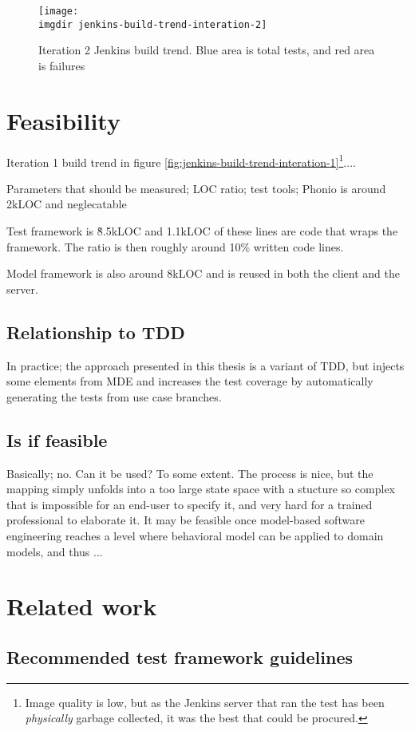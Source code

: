 \begin{figure}[!hbpt]
\centering
\texttt{[image: \\imgdir jenkins-build-trend-interation-2]}
\caption{Iteration 2 Jenkins build trend. Blue area is total tests, and red area is failures}
\label{fig:jenkins-build-trend-interation-2}
\end{figure}


\section{Feasibility}
Iteration 1 build trend in figure \ref{fig:jenkins-build-trend-interation-1}\footnote{Image quality is low, but as the Jenkins server that ran the test has been \emph{physically} garbage collected, it was the best that could be procured.}....

Parameters that should be measured; LOC ratio; test tools; Phonio is around 2kLOC and neglecatable

Test framework is \~8.5kLOC and 1.1kLOC of these lines are code that wraps the framework. The ratio is then roughly around 10\% written code lines.

Model framework is also around 8kLOC and is reused in both the client and the server.
\subsection{Relationship to TDD}
In practice; the approach presented in this thesis is a variant of TDD, but injects some elements from MDE and increases the test coverage by automatically generating the tests from use case branches.



\subsection{Is if feasible}
Basically; no. Can it be used? To some extent. The process is nice, but the mapping simply unfolds into a too large state space with a stucture so complex that is impossible for an end-user to specify it, and very hard for a trained professional to elaborate it. It may be feasible once model-based software engineering reaches a level where behavioral model can be applied to domain models, and thus ...
\section{Related work}

\subsection{Recommended test framework guidelines}
